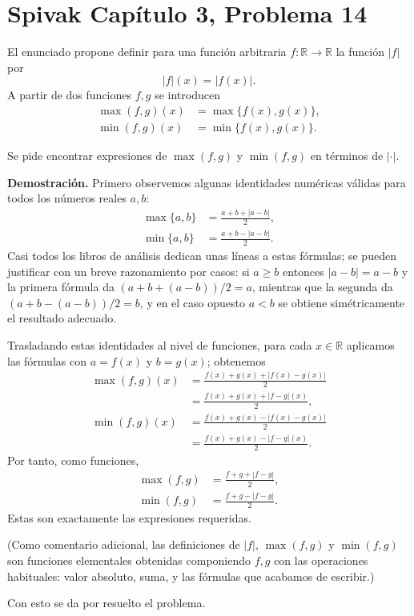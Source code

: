 \section*{Spivak Capítulo 3, Problema 14}

El enunciado propone definir para una función arbitraria $f:\mathbb{R}\to\mathbb{R}$ la función $|f|$ por
$$|f|(x)=|f(x)|.
$$
A partir de dos funciones $f,g$ se introducen
\begin{align*}
\max(f,g)(x)&=\max\{f(x),g(x)\},\\
\min(f,g)(x)&=\min\{f(x),g(x)\}.
\end{align*}

Se pide encontrar expresiones de $\max(f,g)$ y $\min(f,g)$ en términos de $|\cdot|$.

\textbf{Demostración.}
Primero observemos algunas identidades numéricas válidas para todos los números reales $a,b$:
\begin{align}
\max\{a,b\}&=\frac{a+b+|a-b|}{2},\\
\min\{a,b\}&=\frac{a+b-|a-b|}{2}.\label{eq:minformula}
\end{align}
Casi todos los libros de análisis dedican unas líneas a estas fórmulas; se pueden justificar con un breve razonamiento por casos: si $a\ge b$ entonces $|a-b|=a-b$ y la primera fórmula da $(a+b+(a-b))/2=a$, mientras que la segunda da $(a+b-(a-b))/2=b$, y en el caso opuesto $a<b$ se obtiene simétricamente el resultado adecuado.

Trasladando estas identidades al nivel de funciones, para cada $x\in\mathbb{R}$ aplicamos las fórmulas con $a=f(x)$ y $b=g(x)$; obtenemos
\begin{align*}
\max(f,g)(x)&=\frac{f(x)+g(x)+|f(x)-g(x)|}{2} \\
&=\frac{f(x)+g(x)+|f-g|(x)}2,\\
\min(f,g)(x)&=\frac{f(x)+g(x)-|f(x)-g(x)|}{2} \\
&=\frac{f(x)+g(x)-|f-g|(x)}2.
\end{align*}
Por tanto, como funciones,
\begin{align*}
\max(f,g)&=\frac{f+g+|f-g|}{2}, \\
\min(f,g)&=\frac{f+g-|f-g|}{2}.
\end{align*}
Estas son exactamente las expresiones requeridas.

(Como comentario adicional, las definiciones de $|f|$, $\max(f,g)$ y $\min(f,g)$ son funciones elementales obtenidas componiendo $f,g$ con las operaciones habituales: valor absoluto, suma, y las fórmulas que acabamos de escribir.)

Con esto se da por resuelto el problema.